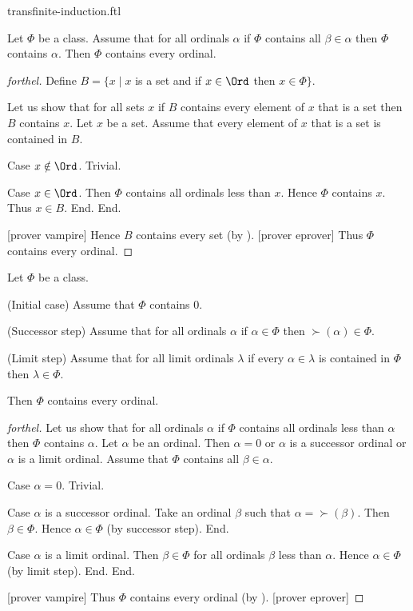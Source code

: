 \documentclass{naproche-library}
\begin{document}
\begin{smodule}[title=Transfinite Induction]{transfinite-induction.ftl}

\begin{theorem}[forthel,id=SET_THEORY_02_8493935460614144]
  Let $\Phi$ be a class.
  Assume that for all ordinals $\alpha$ if $\Phi$ contains all $\beta \in \alpha$ then $\Phi$ contains $\alpha$.
  Then $\Phi$ contains every ordinal.
\end{theorem}
\begin{proof}[forthel]
  Define $B = \{ x \mid x$ is a set and if $x \in \Ord$ then $x \in \Phi \}$.

  Let us show that for all sets $x$ if $B$ contains every element of $x$ that is a set then $B$ contains $x$.
    Let $x$ be a set.
    Assume that every element of $x$ that is a set is contained in $B$.

    Case $x \notin \Ord$. Trivial.

    Case $x \in \Ord$.
      Then $\Phi$ contains all ordinals less than $x$.
      Hence $\Phi$ contains $x$.
      Thus $x \in B$.
    End.
  End.

  [prover vampire]
  Hence $B$ contains every set (by ).
  [prover eprover]
  Thus $\Phi$ contains every ordinal.
\end{proof}

\begin{theorem}[forthel,id=SET_THEORY_02_7892040431960064]
  Let $\Phi$ be a class.
  
  (Initial case) Assume that $\Phi$ contains $0$.
  
  (Successor step) Assume that for all ordinals $\alpha$ if $\alpha \in \Phi$ then $\succ(\alpha) \in \Phi$.
  
  (Limit step) Assume that for all limit ordinals $\lambda$ if every $\alpha \in \lambda$ is contained in $\Phi$ then $\lambda \in \Phi$.
  
  Then $\Phi$ contains every ordinal.
\end{theorem}
\begin{proof}[forthel]
  Let us show that for all ordinals $\alpha$ if $\Phi$ contains all ordinals
  less than $\alpha$ then $\Phi$ contains $\alpha$.
    Let $\alpha$ be an ordinal.
    Then $\alpha = 0$ or $\alpha$ is a successor ordinal or $\alpha$ is a
    limit ordinal.
    Assume that $\Phi$ contains all $\beta \in \alpha$.

    Case $\alpha = 0$. Trivial.

    Case $\alpha$ is a successor ordinal.
      Take an ordinal $\beta$ such that $\alpha = \succ(\beta)$.
      Then $\beta \in \Phi$.
      Hence $\alpha \in \Phi$ (by successor step).
    End.

    Case $\alpha$ is a limit ordinal.
      Then $\beta \in \Phi$ for all ordinals $\beta$ less than $\alpha$.
      Hence $\alpha \in \Phi$ (by limit step).
    End.
  End.

  [prover vampire]
  Thus $\Phi$ contains every ordinal (by ).
  [prover eprover]
\end{proof}
\end{smodule}
\end{document}
